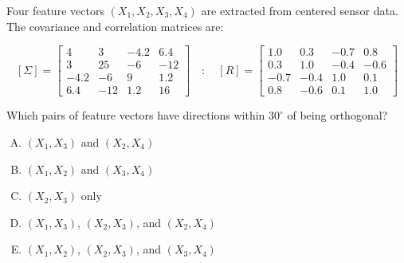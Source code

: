\documentclass[12pt]{amsart}
\begin{document}
Four feature vectors $(X_1, X_2, X_3, X_4)$ are extracted from centered sensor data. The covariance and correlation matrices are:

$$[\Sigma] = \begin{bmatrix}
4 & 3 & -4.2 & 6.4 \\
3 & 25 & -6 & -12 \\
-4.2 & -6 & 9 & 1.2 \\
6.4 & -12 & 1.2 & 16
\end{bmatrix}
\quad : \quad
[R] = \begin{bmatrix}
1.0 & 0.3 & -0.7 & 0.8 \\
0.3 & 1.0 & -0.4 & -0.6 \\
-0.7 & -0.4 & 1.0 & 0.1 \\
0.8 & -0.6 & 0.1 & 1.0
\end{bmatrix}$$

Which pairs of feature vectors have directions within $30^\circ$ of being orthogonal?

\begin{enumerate}[(A)]
\item $(X_1, X_3)$ and $(X_2, X_4)$
\item $(X_1, X_2)$ and $(X_3, X_4)$
\item $(X_2, X_3)$ only
\item $(X_1, X_3)$, $(X_2, X_3)$, and $(X_2, X_4)$
\item $(X_1, X_2)$, $(X_2, X_3)$, and $(X_3, X_4)$
\end{enumerate}

\end{document}
